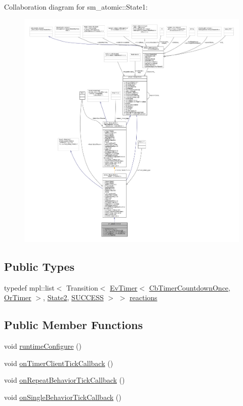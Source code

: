 Collaboration diagram for sm\+\_\+atomic\+:\+:State1\+:
\nopagebreak
\begin{figure}[H]
\begin{center}
\leavevmode
\includegraphics[width=350pt]{structsm__atomic_1_1State1__coll__graph}
\end{center}
\end{figure}
\subsection*{Public Types}
\begin{DoxyCompactItemize}
\item 
typedef mpl\+::list$<$ Transition$<$ \hyperlink{structros__timer__client_1_1EvTimer}{Ev\+Timer}$<$ \hyperlink{classros__timer__client_1_1CbTimerCountdownOnce}{Cb\+Timer\+Countdown\+Once}, \hyperlink{classsm__atomic_1_1OrTimer}{Or\+Timer} $>$, \hyperlink{structsm__atomic_1_1State2}{State2}, \hyperlink{structsmacc_1_1default__transition__tags_1_1SUCCESS}{S\+U\+C\+C\+E\+SS} $>$ $>$ \hyperlink{structsm__atomic_1_1State1_ab05a524c2d0d99c2ca7c4174d49de73c}{reactions}
\end{DoxyCompactItemize}
\subsection*{Public Member Functions}
\begin{DoxyCompactItemize}
\item 
void \hyperlink{structsm__atomic_1_1State1_a47c2e651bb707f14d9b32f92c44f8ebc}{runtime\+Configure} ()
\item 
void \hyperlink{structsm__atomic_1_1State1_adea28f0a0fcedb210a29656f53aeee09}{on\+Timer\+Client\+Tick\+Callback} ()
\item 
void \hyperlink{structsm__atomic_1_1State1_a9d2c943f02a8e0f1d7b86132ada1c6e0}{on\+Repeat\+Behavior\+Tick\+Callback} ()
\item 
void \hyperlink{structsm__atomic_1_1State1_a9cb95d91cf5a22f0d9d079dc04bf58aa}{on\+Single\+Behavior\+Tick\+Callback} ()
\end{DoxyCompactItemize}
